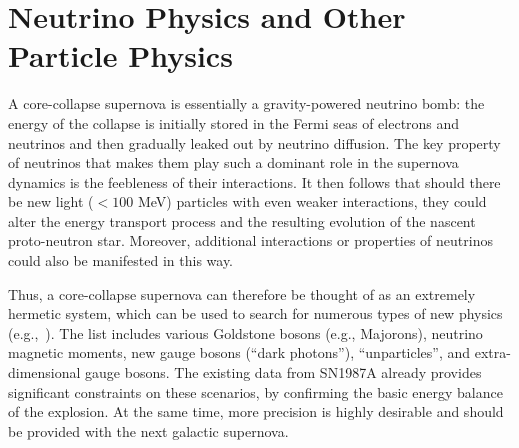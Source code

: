 


\section{Neutrino Physics and Other Particle Physics}
\label{sec:physics-snblowe-neutrino-physics}

A core-collapse supernova is essentially a gravity-powered neutrino bomb: the energy of the collapse is initially stored in the Fermi seas of electrons and neutrinos and then gradually leaked out by neutrino diffusion. The key property of neutrinos that makes them play such a dominant role in the supernova dynamics is the feebleness of their interactions. It then follows that should there be new light ($< 100$ MeV) particles with even weaker interactions, they could alter the energy transport process and the resulting evolution of the nascent proto-neutron star. Moreover, additional interactions or properties of neutrinos could also be manifested in this way. 

Thus, a core-collapse supernova can therefore be thought of as an extremely hermetic system, which can be used to search for numerous types of new physics (e.g.,~\cite{Schramm:1990pf,Raffelt:1999tx}). The list includes various Goldstone bosons (e.g., Majorons), neutrino magnetic moments, new gauge bosons (``dark photons''), ``unparticles'', and extra-dimensional gauge bosons. The existing data from SN1987A already provides significant constraints on these scenarios, by confirming the basic energy balance of the explosion. At the same time, more precision is highly desirable and should be provided with the next galactic supernova. 




